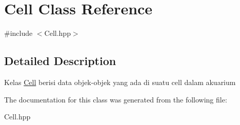 \hypertarget{classCell}{}\section{Cell Class Reference}
\label{classCell}


{\ttfamily \#include $<$Cell.\+hpp$>$}



\subsection{Detailed Description}
Kelas \hyperlink{classCell}{Cell} berisi data objek-\/objek yang ada di suatu cell dalam akuarium 

The documentation for this class was generated from the following file\+:\begin{DoxyCompactItemize}
\item 
Cell.\+hpp\end{DoxyCompactItemize}
